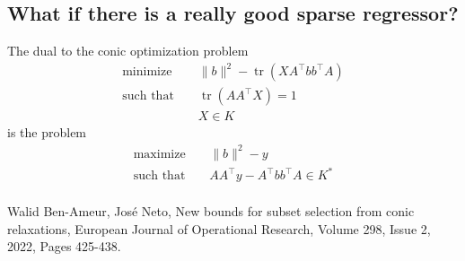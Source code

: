 \documentclass[a4paper]{article}
\DeclareMathOperator*{\tr}{tr}
\begin{document}
\subsection{What if there is a really good sparse regressor?}
The dual to the conic optimization problem
\begin{equation}
\begin{aligned}
    \text{minimize} &&\|b\|^2 - \tr(XA^{\intercal}bb^{\intercal}A)\\
    \text{such that } && \tr(AA^{\intercal}X) = 1\\
                      && X \in K
\end{aligned}
\end{equation}
is the problem
\begin{equation}
\begin{aligned}
    \text{maximize} &&\|b\|^2 - y\\
    \text{such that } && AA^{\intercal}y - A^{\intercal}bb^{\intercal}A  \in K^*\\
\end{aligned}
\end{equation}

\begin{thebibliography}
    
     Walid Ben-Ameur, José Neto, New bounds for subset selection from conic relaxations, European Journal of Operational Research, Volume 298, Issue 2, 2022, Pages 425-438.

\end{thebibliography}
\end{document}
